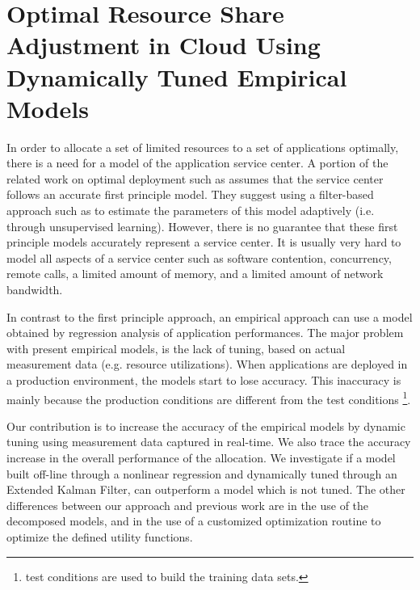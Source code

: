 


\chapter{Optimal Resource Share Adjustment in Cloud Using Dynamically Tuned Empirical Models} 
\label{ch:optimal_tuning_of_application_resource_shares} 

In order to allocate a set of limited resources to a set of applications optimally, there is a need for a model of the application service center. 
A portion of the related work on optimal deployment such as \cite{li_fast_2009,li_performance_2009} assumes that the service center follows an accurate first principle model. They suggest using a filter-based approach such as \cite{zheng-integrated-2011} to estimate the parameters of this model adaptively (i.e.  through unsupervised learning).   
However, there is no guarantee that these first principle models accurately represent a service center. It is usually very hard to model all aspects of a service center such as software contention, concurrency, remote calls, a limited amount of memory, and a limited amount of network bandwidth.  

In contrast to the first principle approach, an empirical approach can use a model obtained by regression analysis of application performances. The major problem with present empirical models, is the lack of tuning, based on actual measurement data (e.g. resource utilizations).  
When applications are deployed in a production environment, the models start to lose accuracy. This inaccuracy is mainly because the production conditions are different from the test conditions \footnote{test conditions are used to build the training data sets.}.
 
Our contribution is to increase the accuracy of the empirical models by dynamic tuning using measurement data captured in real-time. We also trace the accuracy increase in the overall performance of the allocation. We investigate if a model built off-line through a nonlinear regression and dynamically tuned through an Extended Kalman Filter, can outperform a model which is not tuned. The other differences between our approach and previous work are in the use of the decomposed models, and in the use of a customized optimization routine to optimize the defined utility functions.   

